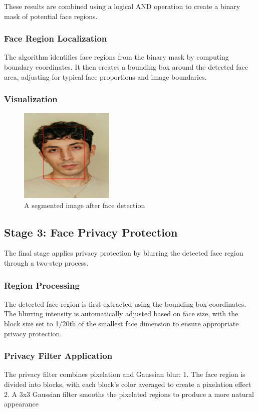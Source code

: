 \documentclass[12pt,a4paper]{article}
\begin{document}
These results are combined using a logical AND operation to create a binary mask of potential face regions.

\subsubsection{Face Region Localization}
The algorithm identifies face regions from the binary mask by computing boundary coordinates. It then creates a bounding box around the detected face area, adjusting for typical face proportions and image boundaries.

\subsubsection{Visualization}
\begin{figure}[h]
    \centering
    \includegraphics[width=0.4\textwidth]{data/segmented/sample_image.jpg}
    \caption{A segmented image after face detection}
    \label{fig:segmented_image}
\end{figure}

\subsection{Stage 3: Face Privacy Protection}
The final stage applies privacy protection by blurring the detected face region through a two-step process.

\subsubsection{Region Processing}
The detected face region is first extracted using the bounding box coordinates. The blurring intensity is automatically adjusted based on face size, with the block size set to 1/20th of the smallest face dimension to ensure appropriate privacy protection.

\subsubsection{Privacy Filter Application}
The privacy filter combines pixelation and Gaussian blur:
1. The face region is divided into blocks, with each block's color averaged to create a pixelation effect
2. A 3x3 Gaussian filter smooths the pixelated regions to produce a more natural appearance
\end{document}
